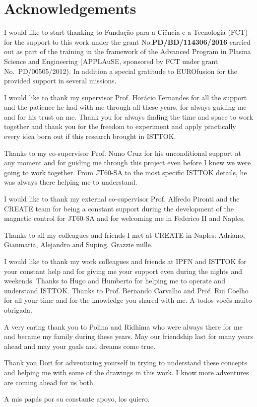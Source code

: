 \chapter*{Acknowledgements}

I would like to start thanking to Funda\c{c}\~{a}o para a Ci\^{e}ncia e a Tecnologia (FCT) for the support to this work under the grant No.\textbf{PD/BD/114306/2016} carried out as part of the training in the framework of the Advanced Program in Plasma Science and Engineering (APPLAuSE, sponsored by FCT under grant No.~PD/00505/2012). In addition a special gratitude to EUROfusion for the provided support in several missions. 
\smallskip

I would like to thank my supervisor Prof. Horácio Fernandes for all the support and the patience he had with me through all these years, for always guiding me and for his trust on me. Thank you for always finding the time and space to work together and thank you for the  freedom to experiment and apply practically every idea born out if this research brought in ISTTOK.
\smallskip

Thanks to my co-supervisor Prof. Nuno Cruz for his unconditional support at any moment and for guiding me through this project even before I knew we were going to work together. From JT60-SA to the most specific ISTTOK details, he was always there helping me to understand.
\smallskip

I would like to thank my external co-supervisor Prof. Alfredo Pironti and the CREATE team for being a constant support during the development of the magnetic control for JT60-SA  and for welcoming me in Federico II and Naples. \smallskip

Thanks to all my colleagues and friends I met at CREATE in Naples: Adriano, Gianmaria, Alejandro and Suping. Grazzie mille.\smallskip

I would like to thank my work colleagues and friends at IPFN and ISTTOK for your constant help and for giving me your support even during the nights and weekends. Thanks to Hugo and Humberto for helping me to operate and understand ISTTOK. Thanks to Prof. Bernando Carvalho and Prof. Rui Coelho for all your time and for the knowledge you shared with me. A todos vocês muito obrigada.\smallskip


A very caring thank you to Polina and Ridhima who were always there for me and became my family during these years. May our friendship last for many years ahead and may your goals and dreams come true.\smallskip

Thank you Dori for adventuring yourself in trying to understand these concepts and helping me with some of the drawings in this work. I know more adventures are coming ahead for us both.\smallskip

A mis papás por su constante apoyo, los quiero.   

 





